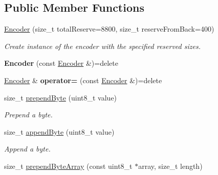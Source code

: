\subsection*{Public Member Functions}
\begin{DoxyCompactItemize}
\item 
\hyperlink{classndn_1_1encoding_1_1Encoder_a48af655910219944a6939cdc862793d9}{Encoder} (size\+\_\+t total\+Reserve=8800, size\+\_\+t reserve\+From\+Back=400)
\begin{DoxyCompactList}\small\item\em Create instance of the encoder with the specified reserved sizes. \end{DoxyCompactList}\item 
{\bfseries Encoder} (const \hyperlink{classndn_1_1encoding_1_1Encoder}{Encoder} \&)=delete\hypertarget{classndn_1_1encoding_1_1Encoder_a432c1c578cf03d8c7529186033a471f8}{}\label{classndn_1_1encoding_1_1Encoder_a432c1c578cf03d8c7529186033a471f8}

\item 
\hyperlink{classndn_1_1encoding_1_1Encoder}{Encoder} \& {\bfseries operator=} (const \hyperlink{classndn_1_1encoding_1_1Encoder}{Encoder} \&)=delete\hypertarget{classndn_1_1encoding_1_1Encoder_abbc106d277674d1b0bebdee0afe4c1d9}{}\label{classndn_1_1encoding_1_1Encoder_abbc106d277674d1b0bebdee0afe4c1d9}

\item 
size\+\_\+t \hyperlink{classndn_1_1encoding_1_1Encoder_ab09ba501d367fb0abbb715251b614a9b}{prepend\+Byte} (uint8\+\_\+t value)\hypertarget{classndn_1_1encoding_1_1Encoder_ab09ba501d367fb0abbb715251b614a9b}{}\label{classndn_1_1encoding_1_1Encoder_ab09ba501d367fb0abbb715251b614a9b}

\begin{DoxyCompactList}\small\item\em Prepend a byte. \end{DoxyCompactList}\item 
size\+\_\+t \hyperlink{classndn_1_1encoding_1_1Encoder_a347378d4f2a99b7514e05c0b3ea26400}{append\+Byte} (uint8\+\_\+t value)\hypertarget{classndn_1_1encoding_1_1Encoder_a347378d4f2a99b7514e05c0b3ea26400}{}\label{classndn_1_1encoding_1_1Encoder_a347378d4f2a99b7514e05c0b3ea26400}

\begin{DoxyCompactList}\small\item\em Append a byte. \end{DoxyCompactList}\item 
size\+\_\+t \hyperlink{classndn_1_1encoding_1_1Encoder_a644e71a78448ced49aa2e1419dfd94a8}{prepend\+Byte\+Array} (const uint8\+\_\+t $\ast$array, size\+\_\+t length)\hypertarget{classndn_1_1encoding_1_1Encoder_a644e71a78448ced49aa2e1419dfd94a8}{}\label{classndn_1_1encoding_1_1Encoder_a644e71a78448ced49aa2e1419dfd94a8}


\end{DoxyCompactItemize}
